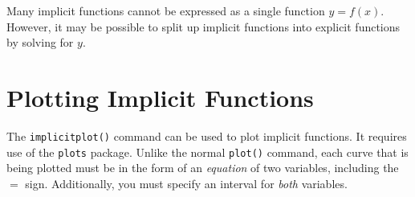 Many implicit functions cannot be expressed as a single function $y=f(x)$. However, it may be possible to split up implicit functions into explicit functions by solving for $y$.


\begin{maplegroup}
\begin{mapleinput}
\end{mapleinput}
\mapleresult
\begin{maplelatex}
\end{maplelatex}
\end{maplegroup}


\begin{maplegroup}
\begin{mapleinput}
\end{mapleinput}
\mapleresult
\begin{maplelatex}
\end{maplelatex}
\end{maplegroup}

\section{Plotting Implicit Functions}

The \texttt{implicitplot()} command can be used to plot implicit functions. It requires use of the \texttt{plots} package. Unlike the normal \texttt{plot()} command, each curve that is being plotted must be in the form of an \textit{equation} of two variables, including the $=$ sign. Additionally, you must specify an interval for \textit{both} variables.

